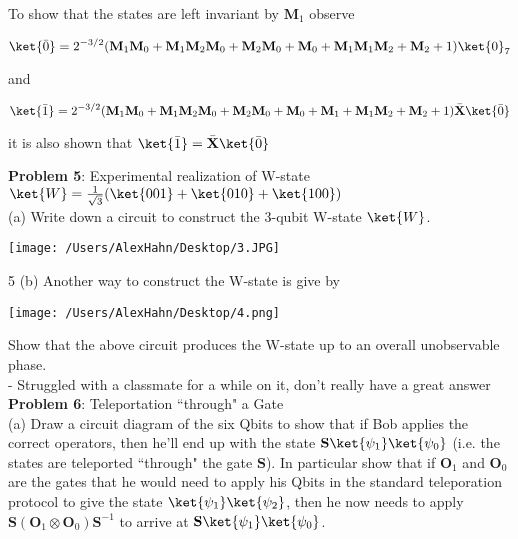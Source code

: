 To show that the states are left invariant by $\textbf{M}_1$ observe

$$\ket{\bar{0}}=2^{-3/2}(\textbf{M}_1\textbf{M}_0+\textbf{M}_1\textbf{M}_2\textbf{M}_0+\textbf{M}_2\textbf{M}_0+\textbf{M}_0+\textbf{M}_1\textbf{M}_1\textbf{M}_2+\textbf{M}_2+1)\ket{0}_7$$

and

$$\ket{\bar{1}}=2^{-3/2}(\textbf{M}_1\textbf{M}_0+\textbf{M}_1\textbf{M}_2\textbf{M}_0+\textbf{M}_2\textbf{M}_0+\textbf{M}_0+\textbf{M}_1+\textbf{M}_1\textbf{M}_2+\textbf{M}_2+1)\bar{\textbf{X}}\ket{\bar{0}}$$

it is also shown that $\ket{\bar{1}}=\bar{\textbf{X}}\ket{\bar{0}}$

\textbf{Problem 5}: Experimental realization of W-state
$\ket{W}=\frac{1}{\sqrt{3}}(\ket{001}+\ket{010}+\ket{100})$\\

(a) Write down a circuit to construct the 3-qubit W-state $\ket{W}$.

\begin{center}
\texttt{[image: /Users/AlexHahn/Desktop/3.JPG]}
\end{center}

5 (b) Another way to construct the W-state is give by

\begin{center}
\texttt{[image: /Users/AlexHahn/Desktop/4.png]}
\end{center}

Show that the above circuit produces the W-state up to an overall
unobservable phase.\\


- Struggled with a classmate for a while on it, don't really have a great
answer\\

\textbf{Problem 6}: Teleportation ``through" a Gate\\

(a) Draw a circuit diagram of the six Qbits to show that if Bob applies the
correct operators, then he'll end up with the state
$\textbf{S}\ket{\psi_1}\ket{\psi_0}$ (i.e. the states are teleported
``through" the gate $\textbf{S}$). In particular show that if
$\textbf{O}_1$ and $\textbf{O}_0$ are the gates that he would need to apply
his Qbits in the standard teleporation protocol to give the state
$\ket{\psi_1}\ket{\psi_2}$, then he now needs to apply
$\textbf{S}(\textbf{O}_1\otimes\textbf{O}_0)\textbf{S}^{-1}$ to arrive at
$\textbf{S}\ket{\psi_1}\ket{\psi_0}$.\\

